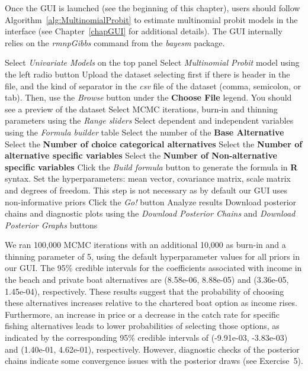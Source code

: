 Once the GUI is launched (see the beginning of this chapter), users should follow Algorithm~\ref{alg:MultinomialProbit} to estimate multinomial probit models in the interface (see Chapter~\ref{chapGUI} for additional details). The GUI internally relies on the \textit{rmnpGibbs} command from the \textit{bayesm} package.

\begin{algorithm}[h!]
	\caption{Multinomial probit models}\label{alg:MultinomialProbit}
	\begin{algorithmic}[1]  		 			
		\State Select \textit{Univariate Models} on the top panel
		\State Select \textit{Multinomial Probit} model using the left radio button
		\State Upload the dataset selecting first if there is header in the file, and the kind of separator in the \textit{csv} file of the dataset (comma, semicolon, or tab). Then, use the \textit{Browse} button under the \textbf{Choose File} legend. You should see a preview of the dataset
		\State Select MCMC iterations, burn-in and thinning parameters using the \textit{Range sliders}
		\State Select dependent and independent variables using the \textit{Formula builder} table
		\State Select the number of the \textbf{Base Alternative}
		\State Select the \textbf{Number of choice categorical alternatives}
		\State Select the \textbf{Number of alternative specific variables}
		\State Select the \textbf{Number of Non-alternative specific variables} 
		\State Click the \textit{Build formula} button to generate the formula in \textbf{R} syntax.
		\State Set the hyperparameters: mean vector, covariance matrix, scale matrix and degrees of freedom. This step is not necessary as by default our GUI uses non-informative priors
		\State Click the \textit{Go!} button
		\State Analyze results
		\State Download posterior chains and diagnostic plots using the \textit{Download Posterior Chains} and \textit{Download Posterior Graphs} buttons
	\end{algorithmic} 
\end{algorithm}


We ran 100,000 MCMC iterations with an additional 10,000 as burn-in and a thinning parameter of 5, using the default hyperparameter values for all priors in our GUI. The 95\% credible intervals for the coefficients associated with income in the beach and private boat alternatives are (8.58e-06, 8.88e-05) and (3.36e-05, 1.45e-04), respectively. These results suggest that the probability of choosing these alternatives increases relative to the chartered boat option as income rises. Furthermore, an increase in price or a decrease in the catch rate for specific fishing alternatives leads to lower probabilities of selecting those options, as indicated by the corresponding 95\% credible intervals of (-9.91e-03, -3.83e-03) and (1.40e-01, 4.62e-01), respectively. However, diagnostic checks of the posterior chains indicate some convergence issues with the posterior draws (see Exercise~5).

